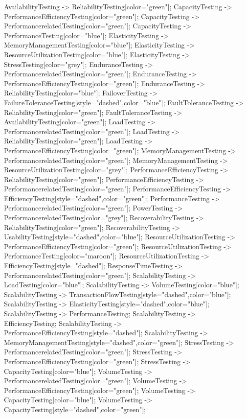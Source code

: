\documentclass{article}
\begin{document}
{AvailabilityTesting -> ReliabilityTesting[color="green"];
CapacityTesting -> PerformanceEfficiencyTesting[color="green"];
CapacityTesting -> PerformancerelatedTesting[color="green"];
CapacityTesting -> PerformanceTesting[color="blue"];
ElasticityTesting -> MemoryManagementTesting[color="blue"];
ElasticityTesting -> ResourceUtilizationTesting[color="blue"];
ElasticityTesting -> StressTesting[color="grey"];
EnduranceTesting -> PerformancerelatedTesting[color="green"];
EnduranceTesting -> PerformanceEfficiencyTesting[color="green"];
EnduranceTesting -> ReliabilityTesting[color="blue"];
FailoverTesting -> FailureToleranceTesting[style="dashed",color="blue"];
FaultToleranceTesting -> ReliabilityTesting[color="green"];
FaultToleranceTesting -> AvailabilityTesting[color="green"];
LoadTesting -> PerformancerelatedTesting[color="green"];
LoadTesting -> ReliabilityTesting[color="green"];
LoadTesting -> PerformanceEfficiencyTesting[color="green"];
MemoryManagementTesting -> PerformancerelatedTesting[color="green"];
MemoryManagementTesting -> ResourceUtilizationTesting[color="grey"];
PerformanceEfficiencyTesting -> ReliabilityTesting[color="green"];
PerformanceEfficiencyTesting -> PerformancerelatedTesting[color="green"];
PerformanceEfficiencyTesting -> EfficiencyTesting[style="dashed",color="green"];
PerformanceTesting -> PerformancerelatedTesting[color="green"];
PowerTesting -> PerformancerelatedTesting[color="grey"];
RecoverabilityTesting -> ReliabilityTesting[color="green"];
RecoverabilityTesting -> UsabilityTesting[style="dashed",color="blue"];
ResourceUtilizationTesting -> PerformanceEfficiencyTesting[color="green"];
ResourceUtilizationTesting -> PerformanceTesting[color="maroon"];
ResourceUtilizationTesting -> EfficiencyTesting[style="dashed"];
ResponseTimeTesting -> PerformancerelatedTesting[color="green"];
ScalabilityTesting -> LoadTesting[color="blue"];
ScalabilityTesting -> VolumeTesting[color="blue"];
ScalabilityTesting -> TransactionFlowTesting[style="dashed",color="blue"];
ScalabilityTesting -> ElasticityTesting[style="dashed",color="blue"];
ScalabilityTesting -> PerformanceTesting;
ScalabilityTesting -> EfficiencyTesting;
ScalabilityTesting -> PerformanceEfficiencyTesting[style="dashed"];
ScalabilityTesting -> MemoryManagementTesting[style="dashed",color="green"];
StressTesting -> PerformancerelatedTesting[color="green"];
StressTesting -> PerformanceEfficiencyTesting[color="green"];
StressTesting -> CapacityTesting[color="blue"];
VolumeTesting -> PerformancerelatedTesting[color="green"];
VolumeTesting -> PerformanceEfficiencyTesting[color="green"];
VolumeTesting -> CapacityTesting[color="blue"];
VolumeTesting -> CapacityTesting[style="dashed",color="green"];

}
\end{document}
